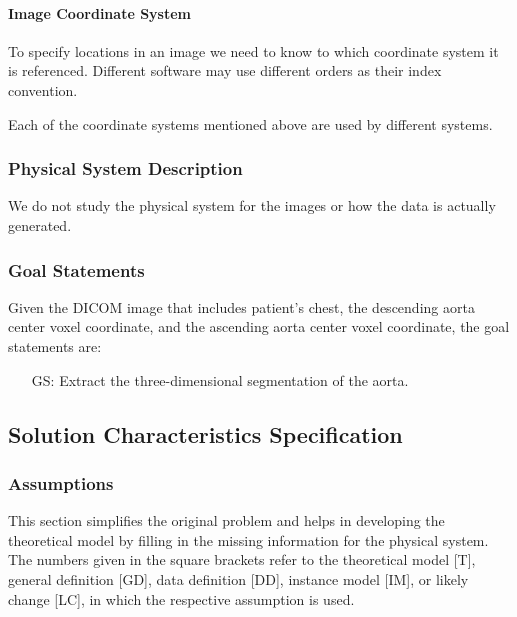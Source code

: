 \documentclass[12pt]{article}
\newcounter{goalnum} %
\begin{document}
\paragraph{Image Coordinate System}
 
To specify locations in an image we need to know to which coordinate system it is referenced. Different software may use different orders as their index convention.

\noindent Each of the coordinate systems mentioned above are used by different systems.

\subsubsection{Physical System Description} \label{sec_phySystDescrip}
We do not study the physical system for the images or how the data is actually generated.

\subsubsection{Goal Statements}

\noindent Given the DICOM image that includes patient's chest,
the descending aorta center voxel coordinate,
and the ascending aorta center voxel coordinate, the goal statements are:

\begin{itemize}

\item[GS\refstepcounter{goalnum}\thegoalnum \label{Gsegment}:] 
Extract the three-dimensional segmentation of the aorta.

\end{itemize}

\subsection{Solution Characteristics Specification}

\subsubsection{Assumptions} \label{sec_assumpt}

This section simplifies the original problem and helps in developing the
theoretical model by filling in the missing information for the physical
system. The numbers given in the square brackets refer to the theoretical model
[T], general definition [GD], data definition [DD], instance model [IM], or
likely change [LC], in which the respective assumption is used.
\end{document}

